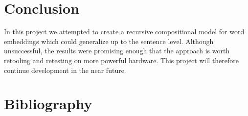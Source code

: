 \documentclass[11pt]{article}
\begin{document}
\section{Conclusion}

In this project we attempted to create a recursive compositional model for word embeddings which could generalize up to the sentence level. Although unsuccessful, the results were promising enough that the approach is worth retooling and retesting on more powerful hardware. This project will therefore continue development in the near future.

\section{Bibliography}


%
%

\end{document}

